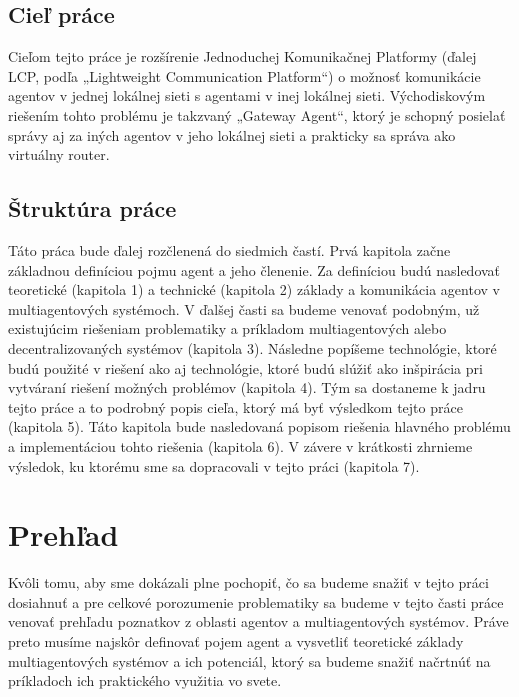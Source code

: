 \documentclass[12pt,a4paper]{report}
\begin{document}
\section{Cieľ práce}
Cieľom tejto práce je rozšírenie Jednoduchej Komunikačnej Platformy (ďalej LCP, podľa „Lightweight Communication Platform“) o možnosť komunikácie agentov v jednej lokálnej sieti s agentami v inej lokálnej sieti. Východiskovým riešením tohto problému je takzvaný „Gateway Agent“, ktorý je schopný posielať správy aj za iných agentov v jeho lokálnej sieti a prakticky sa správa ako virtuálny router.
\newline
\section{Štruktúra práce}
Táto práca bude ďalej rozčlenená do siedmich častí. Prvá kapitola začne základnou definíciou pojmu agent a jeho členenie. Za definíciou budú nasledovať teoretické (kapitola 1) a technické (kapitola 2) základy a komunikácia agentov v multiagentových systémoch. V ďalšej časti sa budeme venovať podobným, už existujúcim riešeniam problematiky a príkladom multiagentových alebo decentralizovaných systémov (kapitola 3). Následne popíšeme technológie, ktoré budú použité v riešení ako aj technológie, ktoré budú slúžiť ako inšpirácia pri vytváraní riešení možných problémov (kapitola 4). Tým sa dostaneme k jadru tejto práce a to podrobný popis cieľa, ktorý má byť výsledkom tejto práce (kapitola 5). Táto kapitola bude nasledovaná popisom riešenia hlavného problému a implementáciou tohto riešenia (kapitola 6). V závere v krátkosti zhrnieme výsledok, ku ktorému sme sa dopracovali v tejto práci (kapitola 7).  
\newline

\chapter{Prehľad}
	Kvôli tomu, aby sme dokázali plne pochopiť, čo sa budeme snažiť v tejto práci dosiahnuť a pre celkové porozumenie problematiky sa budeme v tejto časti práce venovať prehľadu poznatkov z oblasti agentov a multiagentových systémov. Práve preto musíme najskôr definovať pojem agent a vysvetliť teoretické základy multiagentových systémov a ich potenciál, ktorý sa budeme snažiť načrtnúť na príkladoch ich praktického využitia vo svete. 
\newline
\end{document}
